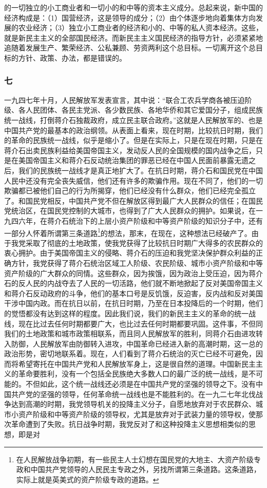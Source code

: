 \documentclass[cn,11pt,chinese]{elegantbook}
\def\myformat#1{\hfil\hfil #1}
\begin{document}
的一切独立的小工商业者和一切小的和中等的资本主义成分。总起来说，新中国的经济构成是：（1）国营经济，这是领导的成分；（2）由个体逐步地向着集体方向发展的农业经济；（3）独立小工商业者的经济和小的、中等的私人资本经济。这些，就是新民主主义的全部国民经济。而新民主主义国民经济的指导方针，必须紧紧地追随着发展生产、繁荣经济、公私兼顾、劳资两利这个总目标。一切离开这个总目标的方针、政策、办法，都是错误的。\\
\subsubsection*{\myformat{七}}
一九四七年十月，人民解放军发表宣言，其中说：“联合工农兵学商各被压迫阶级、各人民团体、各民主党派、各少数民族、各地华侨和其它爱国分子，组成民族统一战线，打倒蒋介石独裁政府，成立民主联合政府。”这就是人民解放军的、也是中国共产党的最基本的政治纲领。从表面上看来，现在时期，比较抗日时期，我们的革命的民族统一战线，似乎是缩小了。但是在实际上，只是在现在时期，只是在蒋介石出卖民族利益给美国帝国主义，发动反人民的全国规模的国内战争之后，只是在美国帝国主义和蒋介石反动统治集团的罪恶已经在中国人民面前暴露无遗之后，我们的民族统一战线才是真正地扩大了。在抗日时期，蒋介石和国民党在中国人民中还没有完全丧失威信，他们还有许多的欺骗作用。现在不同了，他们的一切欺骗都已被他们自己的行为所揭穿，他们已经没有什么群众，他们已经完全孤立了。和国民党相反，中国共产党不但在解放区得到最广大人民群众的信任；在国民党统治区，在国民党控制的大城市，也得到了广大人民群众的拥护。如果说，在一九四六年，在蒋介石统治下的上层小资产阶级和中等资产阶级的知识分子中，还有一部分人怀着所谓第三条道路\footnote[12]{ 在人民解放战争初期，有一些民主人士幻想在国民党的大地主、大资产阶级专政和中国共产党领导的人民民主专政之外，另找所谓第三条道路。这条道路，实际上就是英美式的资产阶级专政的道路。}的想法，那末，在现在，这种想法已经破产了。由于我党采取了彻底的土地政策，使我党获得了比较抗日时期广大得多的农民群众的衷心拥护。由于美国帝国主义的侵略、蒋介石的压迫和我党坚决保护群众利益的正确方针，我党获得了蒋介石统治区域工人阶级、农民阶级、城市小资产阶级和中等资产阶级的广大群众的同情。这些群众，因为挨饿，因为政治上受压迫，因为蒋介石的反人民的内战夺去了人民的一切活路，他们就不断地掀起了反对美国帝国主义和蒋介石反动政府的斗争，他们的基本口号是反饥饿，反迫害，反内战和反对美国干涉中国内政。而在抗日以前，在抗日时期，乃至在日本投降后的一个时期，他们的觉悟都没有达到这样的程度。因此我们说，我们的新民主主义的革命的统一战线，现在比过去任何时期都要广大，也比过去任何时期都要巩固。这件事，不但同我们的土地政策和城市政策相联系，而且同人民解放军的胜利，同蒋介石由进攻转入防御，人民解放军由防御转入进攻，中国革命已经进入新的高潮时期，这一总的政治形势，密切地联系着。现在，人们看到了蒋介石统治的灭亡已经不可避免，因而将希望寄托在中国共产党和人民解放军身上，这是很自然的道理。中国新民主主义的革命要胜利，没有一个包括全民族绝大多数人口的最广泛的统一战线，是不可能的。不但如此，这个统一战线还必须是在中国共产党的坚强的领导之下。没有中国共产党的坚强的领导，任何革命统一战线也是不能胜利的。在一九二七年北伐战争达到高潮的时期，我党领导机关的投降主义分子，自愿地放弃对于农民群众、城市小资产阶级和中等资产阶级的领导权，尤其是放弃对于武装力量的领导权，使那次革命遭到了失败。抗日战争时期，我党反对了和这种投降主义思想相类似的思想，即是对
\end{document}
